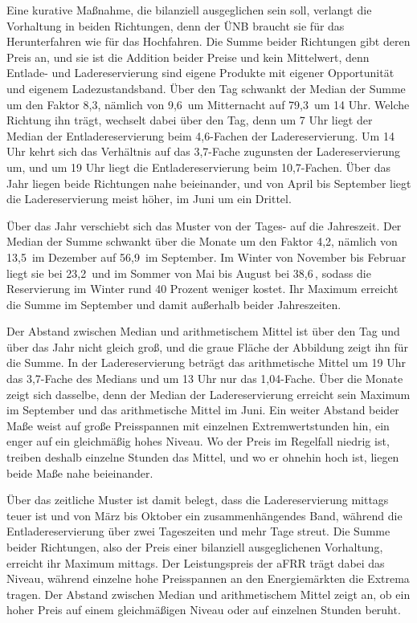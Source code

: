 Eine kurative Maßnahme, die bilanziell ausgeglichen sein soll, verlangt die Vorhaltung in beiden Richtungen, denn der \ac{ÜNB} braucht sie für das Herunterfahren wie für das Hochfahren.
Die Summe beider Richtungen gibt deren Preis an, und sie ist die Addition beider Preise und kein Mittelwert, denn Entlade- und Ladereservierung sind eigene Produkte mit eigener Opportunität und eigenem Ladezustandsband.
Über den Tag schwankt der Median der Summe um den Faktor 8,3, nämlich von 9,6\,\EurMWh{} um Mitternacht auf 79,3\,\EurMWh{} um 14 Uhr.
Welche Richtung ihn trägt, wechselt dabei über den Tag, denn um 7 Uhr liegt der Median der Entladereservierung beim 4,6-Fachen der Ladereservierung.
Um 14 Uhr kehrt sich das Verhältnis auf das 3,7-Fache zugunsten der Ladereservierung um, und um 19 Uhr liegt die Entladereservierung beim 10,7-Fachen.
Über das Jahr liegen beide Richtungen nahe beieinander, und von April bis September liegt die Ladereservierung meist höher, im Juni um ein Drittel.

Über das Jahr verschiebt sich das Muster von der Tages- auf die Jahreszeit.
Der Median der Summe schwankt über die Monate um den Faktor 4,2, nämlich von 13,5\,\EurMWh{} im Dezember auf 56,9\,\EurMWh{} im September.
Im Winter von November bis Februar liegt sie bei 23,2\,\EurMWh{} und im Sommer von Mai bis August bei 38,6\,\EurMWh{}, sodass die Reservierung im Winter rund 40 Prozent weniger kostet.
Ihr Maximum erreicht die Summe im September und damit außerhalb beider Jahreszeiten.

Der Abstand zwischen Median und arithmetischem Mittel ist über den Tag und über das Jahr nicht gleich groß, und die graue Fläche der Abbildung zeigt ihn für die Summe.
In der Ladereservierung beträgt das arithmetische Mittel um 19 Uhr das 3,7-Fache des Medians und um 13 Uhr nur das 1,04-Fache.
Über die Monate zeigt sich dasselbe, denn der Median der Ladereservierung erreicht sein Maximum im September und das arithmetische Mittel im Juni.
Ein weiter Abstand beider Maße weist auf große Preisspannen mit einzelnen Extremwertstunden hin, ein enger auf ein gleichmäßig hohes Niveau.
Wo der Preis im Regelfall niedrig ist, treiben deshalb einzelne Stunden das Mittel, und wo er ohnehin hoch ist, liegen beide Maße nahe beieinander.

Über das zeitliche Muster ist damit belegt, dass die Ladereservierung mittags teuer ist und von März bis Oktober ein zusammenhängendes Band, während die Entladereservierung über zwei Tageszeiten und mehr Tage streut.
Die Summe beider Richtungen, also der Preis einer bilanziell ausgeglichenen Vorhaltung, erreicht ihr Maximum mittags.
Der Leistungspreis der \ac{aFRR} trägt dabei das Niveau, während einzelne hohe Preisspannen an den Energiemärkten die Extrema tragen.
Der Abstand zwischen Median und arithmetischem Mittel zeigt an, ob ein hoher Preis auf einem gleichmäßigen Niveau oder auf einzelnen Stunden beruht.


